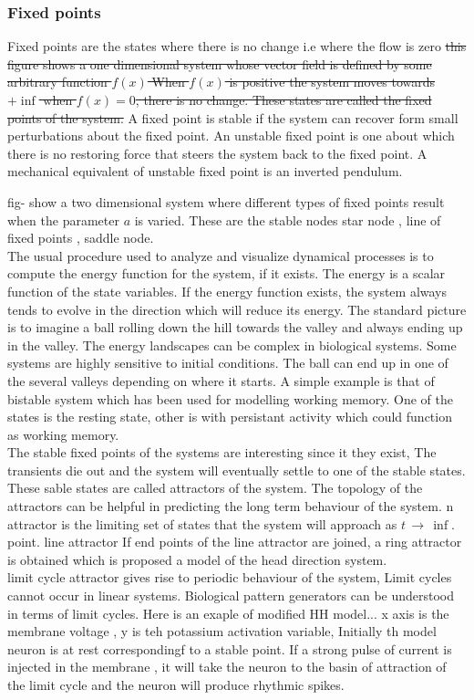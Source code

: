 \subsubsection{Fixed points}
Fixed points are the states where there is no change i.e where the flow is zero \st{this figure shows a one dimensional system whose vector field is defined by some arbitrary function $f(x)$ When $f(x)$ is positive the system moves towards $+ \inf$ when $f(x) = 0$, there is no change. These states are called the fixed points of the system.} A fixed point is stable if the system can recover form small perturbations about the fixed point.  An unstable fixed point is one about which there is no restoring force that steers the system back to the fixed point.  A mechanical equivalent of unstable fixed point is an inverted pendulum.

fig- show a two dimensional system where different types of fixed points result when the parameter $a$ is varied. These are the stable nodes star node , line of fixed points , saddle node. \\

The usual procedure used to analyze and visualize dynamical processes is to compute the energy function for the system, if it exists. The energy is a scalar function of the state variables. If the energy function exists, the system always tends to evolve in the direction which will reduce its energy. The standard picture is to imagine a ball rolling down the hill towards the valley and always ending up in the valley. The energy landscapes can be complex in biological systems. Some systems are highly sensitive to initial conditions. The ball can end up in one of the several valleys depending on where it starts. A simple example is that of bistable system which has been used for modelling working memory. One of the states is the resting state, other is with persistant activity which could function as working memory.\\
The stable fixed points of the systems are interesting since it they exist, The transients die out and the system will eventually settle to one of the stable states. These sable states are called attractors of the system. The topology of the attractors can be helpful in predicting the long term behaviour of the system. n attractor is the limiting set of states that the system will approach as $t\, \rightarrow \, \inf$.\\
point. line attractor If end points of the line attractor are joined, a ring attractor is obtained which is proposed a model of the head direction system. \\
limit cycle attractor gives rise to periodic behaviour of the system, Limit cycles cannot occur in linear systems. Biological pattern generators can be understood in terms of limit cycles. Here is an exaple of modified HH model... x axis is the membrane voltage , y is teh potassium activation variable, Initially th model neuron is at rest correspondingf to a stable point. If a strong pulse of current is injected in the membrane , it will take the neuron to the basin of attraction of the limit cycle and the neuron will produce rhythmic spikes. \\


